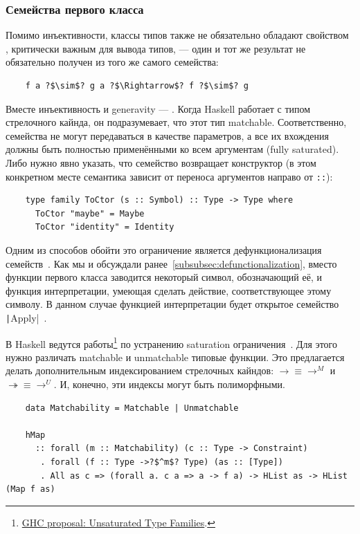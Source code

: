 \subsubsection{Семейства первого класса}

Помимо инъективности, классы типов также не обязательно обладают свойством , критически важным для вывода типов, --- один и тот же результат не обязательно получен из того же самого семейства:
\begin{verbatim}
    f a ?$\sim$? g a ?$\Rightarrow$? f ?$\sim$? g
\end{verbatim}

Вместе инъективность и generavity --- .
Когда Haskell работает с типом стрелочного кайнда, он подразумевает, что этот тип matchable.
Соответственно, семейства не могут передаваться в качестве параметров, а все их вхождения должны быть полностью применёнными ко всем аргументам (fully saturated).
Либо нужно явно указать, что семейство возвращает конструктор (в этом конкретном месте семантика зависит от переноса аргументов направо от \texttt{::}):
\begin{verbatim}
    type family ToCtor (s :: Symbol) :: Type -> Type where
      ToCtor "maybe" = Maybe
      ToCtor "identity" = Identity
\end{verbatim}

Одним из способов обойти это ограничение является дефункционализация семейств~\cite{defunctionalization-slides, eisenberg2014promoting}.
Как мы и обсуждали ранее~\ref{subsubsec:defunctionalization}, вместо функции первого класса заводится некоторый символ, обозначающий её, и функция интерпретации, умеющая сделать действие, соответствующее этому символу.
В данном случае функцией интерпретации будет открытое семейство \texttt|Apply|~\cite[глава 10]{maguire-types}.


В Haskell ведутся работы\footnote{\href{https://ghc-proposals.readthedocs.io/en/latest/proposals/0242-unsaturated-type-families.html}{GHC proposal: Unsaturated Type Families}.} по устранению saturation ограничения~\cite{kiss2019higher}.
Для этого нужно различать matchable и unmatchable типовые функции.
Это предлагается делать дополнительным индексированием стрелочных кайндов: $\to \equiv
\to^M$ и $\twoheadrightarrow \equiv \to^U$.
И, конечно, эти индексы могут быть полиморфными.

\begin{verbatim}
    data Matchability = Matchable | Unmatchable

    hMap
      :: forall (m :: Matchability) (c :: Type -> Constraint)
       . forall (f :: Type ->?$^m$? Type) (as :: [Type])
       . All as c => (forall a. c a => a -> f a) -> HList as -> HList (Map f as)
\end{verbatim}

